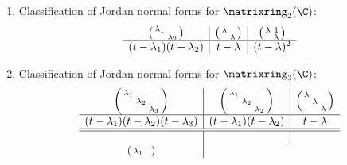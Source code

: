 \documentclass[a4paper]{article}
\newcommand*{\M}{\matrixring}
\theoremstyle{definition}
\begin{document}
\begin{eg}\leavevmode
  \begin{enumerate}
  \item Classification of Jordan normal forms for \(\M_2(\C)\):
  \[
    \begin{array}[h]{c|c|c}
      \begin{psmallmatrix}
        \lambda_1 & \\
        & \lambda_2
      \end{psmallmatrix}
        &
          \begin{psmallmatrix}
            \lambda & \\
            & \lambda
          \end{psmallmatrix}
        &
          \begin{psmallmatrix}
            \lambda & 1 \\
            & \lambda
          \end{psmallmatrix}
      \\ \hline
      (t - \lambda_1)(t - \lambda_2) & t - \lambda & (t - \lambda)^2
    \end{array}
  \]
\item Classification of Jordan normal forms for \(\M_3(\C)\):
  \[
    \begin{array}[h]{c|c|c}
      \begin{psmallmatrix}
        \lambda_1 & & \\
        & \lambda_2 & \\
        & & \lambda_3
      \end{psmallmatrix}
        &
          \begin{psmallmatrix}
            \lambda_1 & & \\
            & \lambda_2 & \\
            & & \lambda_2
          \end{psmallmatrix}
        &
          \begin{psmallmatrix}
            \lambda & & \\
            & \lambda & \\
            & & \lambda
          \end{psmallmatrix}
      \\ \hline
      (t - \lambda_1)(t - \lambda_2)(t - \lambda_3) & (t - \lambda_1)(t - \lambda_2) & t - \lambda \\ \hline \hline
      & & \\
      \begin{psmallmatrix}
        \lambda_1 & & \\

\end{psmallmatrix}
\end{array}\]
\end{enumerate}
\end{eg}
\end{document}
